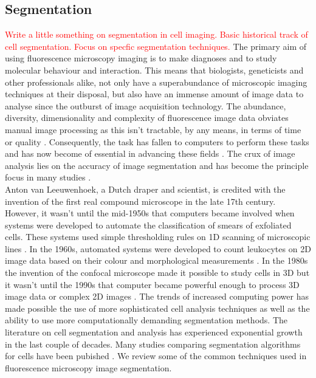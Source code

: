 \subsection{Segmentation}
\textcolor{red}{Write a little something on segmentation in cell imaging. Basic historical track of cell segmentation. Focus on specfic segmentation techniques.}
The primary aim of using fluorescence microscopy imaging is to make diagnoses and to study molecular behaviour and interaction.
This means that biologists, geneticists and other professionals alike, not only have a superabundance of microscopic imaging techniques at their disposal, but also have an immense amount of image data to analyse since the outburst of image acquisition technology.
The abundance, diversity, dimensionality and complexity of fluorescence image data obviates manual image processing as this isn't tractable, by any means, in terms of time or quality \citep{Meijering2012,Ryan2016}.
Consequently, the task has fallen to computers to perform these tasks and has now become of essential in advancing these fields \citep{Alberts2007,Vonesch2006}.
The crux of image analysis lies on the accuracy of image segmentation and has become the principle focus in many studies \citep{Bengtsson2004}.\\

Anton van Leeuwenhoek, a Dutch draper and scientist, is credited with the invention of the first real compound microscope in the late 17th century.
However, it wasn't until the mid-1950s that computers became involved when systems were developed to automate the classification of smears of exfoliated cells.
These systems used simple thresholding rules on 1D scanning of microscopic lines \citep{Tolles1955}.
In the 1960s, automated systems were developed to count leukocytes on 2D image data based on their colour and morphological measurements \citep{Prewitt1966}.
In the 1980s the invention of the confocal microscope made it possible to study cells in 3D but it wasn't until the 1990s that computer became powerful enough to process 3D image data or complex 2D images \citep{Gurcan2009}.
The trends of increased computing power has made possible the use of more sophisticated cell analysis techniques as well as the ability to use more computationally demanding segmentation methods.
The literature on cell segmentation and analysis has experienced exponential growth in the last couple of decades.
Many studies comparing segmentation algorithms for cells have been pubished \citep{Dima2011,Pincus2007,Coelho2009}.
We review some of the common techniques used in fluorescence microscopy image segmentation.

